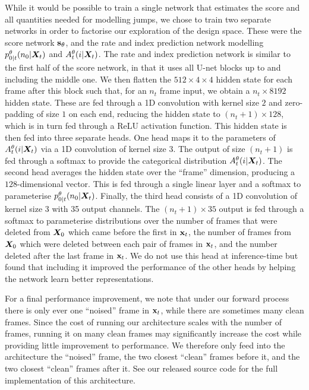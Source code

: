 While it would be possible to train a single network that estimates the score and all quantities needed for modelling jumps, we chose to train two separate networks in order to factorise our exploration of the design space. These were the score network ${\mathbf{s}}_\theta$, and the rate and index prediction network modelling $p_{0|t}^\theta(n_0 | {\bm{X}}_t)$ and $A_t^\theta(i | {\bm{X}}_t)$. The rate and index prediction network is similar to the first half of the score network, in that it uses all U-net blocks up to and including the middle one. We then flatten the $512\times4\times4$ hidden state for each frame after this block such that, for an $n_t$ frame input, we obtain a $n_t \times 8192$ hidden state. These are fed through a 1D convolution with kernel size $2$ and zero-padding of size $1$ on each end, reducing the hidden state to $(n_t+1) \times 128$, which is in turn fed through a ReLU activation function. This hidden state is then fed into three separate heads. One head maps it to the parameters of $A_t^\theta(i | {\bm{X}}_t)$ via a 1D convolution of kernel size 3. The output of size $(n_t+1)$ is fed through a softmax to provide the categorical distribution $A_t^\theta(i | {\bm{X}}_t)$. The second head averages the hidden state over the ``frame'' dimension, producing a $128$-dimensional vector. This is fed through a single linear layer and a softmax to parameterise $p_{0|t}^\theta(n_0 | {\bm{X}}_t)$. Finally, the third head consists of a 1D convolution of kernel size 3 with 35 output channels. The $(n_t+1)\times35$ output is fed through a softmax to parameterise distributions over the number of frames that were deleted from ${\bm{X}}_0$ which came before the first in ${\mathbf{x}}_t$, the number of frames from ${\bm{X}}_0$ which were deleted between each pair of frames in ${\mathbf{x}}_t$, and the number deleted after the last frame in ${\mathbf{x}}_t$. We do not use this head at inference-time but found that including it improved the performance of the other heads by helping the network learn better representations. 

For a final performance improvement, we note that under our forward process there is only ever one ``noised'' frame in ${\mathbf{x}}_t$, while there are sometimes many clean frames. Since the cost of running our architecture scales with the number of frames, running it on many clean frames may significantly increase the cost while providing little improvement to performance. We therefore only feed into the architecture the ``noised'' frame, the two closest ``clean'' frames before it, and the two closest ``clean'' frames after it. See our released source code for the full implementation of this architecture.


